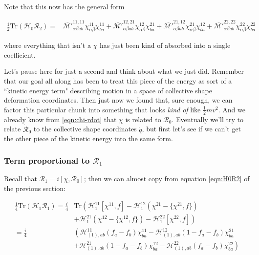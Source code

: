 \noindent Note that this now has the general form

\begin{tcolorbox}
\begin{align}\label{eqn:H0R2_inertia}
\frac{1}{2}\mathrm{Tr}\left(\mathcal{H}_0\mathcal{R}_2\right) = &
 \mathcal{\bar{M'}}^{11,11}_{\alpha\beta ab}\chi^{11}_{\alpha\beta}\chi^{11}_{ba} +
 \mathcal{\bar{M'}}^{12,21}_{\alpha\beta ab}\chi^{12}_{\alpha\beta}\chi^{21}_{ba} +
 \mathcal{\bar{M'}}^{21,12}_{\alpha\beta ab}\chi^{21}_{\alpha\beta}\chi^{12}_{ba} +
 \mathcal{\bar{M'}}^{22,22}_{\alpha\beta ab}\chi^{22}_{\alpha\beta}\chi^{22}_{ba}
\end{align}
\end{tcolorbox}

\noindent where everything that isn't a $\chi$ has just been kind of absorbed into a single coefficient.

Let's pause here for just a second and think about what we just did. Remember that our goal all along has been to treat this piece of the energy as sort of a ``kinetic energy term" describing motion in a space of collective shape deformation coordinates. Then just now we found that, sure enough, we can factor this particular chunk into something that looks \textit{kind of} like $\frac{1}{2}mv^2$. And we already know from \ref{eqn:chi-rdot} that $\chi$ is related to $\mathcal{\dot{R}}_0$. Eventually we'll try to relate $\mathcal{\dot{R}}_0$ to the collective shape coordinates $\dot{q}$, but first let's see if we can't get the other piece of the kinetic energy into the same form.

\subsubsection{Term proportional to $\mathcal{R}_1$}

Recall that $\mathcal{R}_1 = i\left[\chi, \mathcal{R}_0\right]$; then we can almost copy from equation \ref{eqn:H0R2} of the previous section:

\begin{align}\label{eqn:H1R1}
\frac{1}{4}\mathrm{Tr}\left(\mathcal{H}_{1}\mathcal{R}_{1}\right) = \frac{i}{4}
&\mathrm{Tr} \left(\mathcal{H}_{1}^{11}[\chi^{11},f] - \mathcal{H}_{1}^{12}(\chi^{21}-\{\chi^{21},f\}) \right. \nonumber\\
&\left.+ \mathcal{H}_{1}^{21}(\chi^{12}-\{\chi^{12},f\}) - \mathcal{H}_{1}^{22}[\chi^{22},f]\right) \nonumber\\
= \frac{i}{4}
& \left(\mathcal{H}_{(1),ab}^{11}(f_a-f_b)\chi^{11}_{ba} - \mathcal{H}_{(1),ab}^{12}(1-f_a-f_b)\chi^{21}_{ba} \right. \nonumber\\
&\left.+ \mathcal{H}_{(1),ab}^{21}(1-f_a-f_b)\chi^{12}_{ba} - \mathcal{H}_{(1),ab}^{22}(f_a-f_b)\chi^{22}_{ba}\right)
\end{align}

